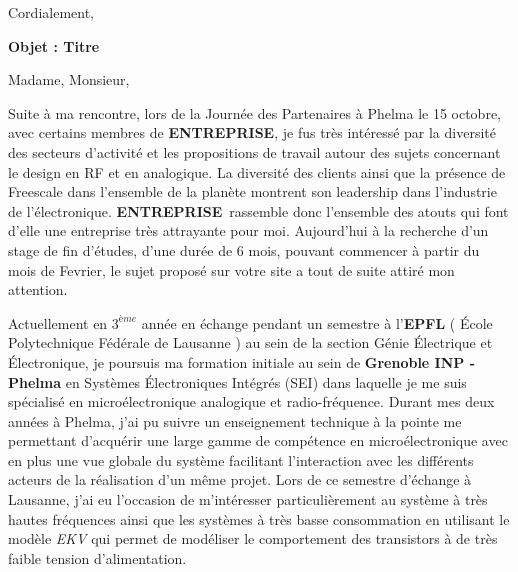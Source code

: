 \documentclass[11pt,a4paper]{moderncv}
\newcommand{\entreprise}{\textbf{ENTREPRISE}}
\begin{document}

\recipient{\entreprise}{Rue et numero\\CP Ville,\\Pays} %
\date{\today} %
\opening{} %
\closing{Cordialement,} %

\makelettertitle %
\justify %
\textbf{Objet : Titre}
\newline{}

Madame, Monsieur,\newline{}

\hspace{0.8cm} Suite à ma rencontre, lors de la Journée des Partenaires à Phelma le 15 octobre, avec certains membres de  \entreprise, je fus très intéressé par la diversité des secteurs d'activité et les propositions de travail autour des sujets concernant le design en RF et en analogique. La diversité des clients ainsi que la présence de Freescale dans l'ensemble de la planète montrent son leadership dans l'industrie de l'électronique. \entreprise~rassemble donc l'ensemble des atouts qui font d'elle une entreprise très attrayante pour moi. Aujourd'hui à la recherche d'un stage de fin d'études, d'une durée de 6 mois, pouvant commencer à partir du mois de Fevrier, le sujet proposé sur votre site a tout de suite attiré mon attention.\newline{}

\hspace{0.8cm} Actuellement en $3^{ème}$ année en échange pendant un semestre à l'\textbf{EPFL} ( École Polytechnique Fédérale de Lausanne ) au sein de la section Génie Électrique et Électronique, je poursuis ma formation initiale au sein de \textbf{Grenoble INP - Phelma} en Systèmes Électroniques Intégrés (SEI) dans laquelle je me suis spécialisé en microélectronique analogique et radio-fréquence. Durant mes deux années à Phelma, j'ai pu suivre un enseignement technique à la pointe me permettant d'acquérir une large gamme de compétence en microélectronique avec en plus une vue globale du système facilitant l'interaction avec les différents acteurs de la réalisation d'un même projet. 
Lors de ce semestre d'échange à Lausanne, j'ai eu l'occasion de m'intéresser particulièrement au système à très hautes fréquences ainsi que les systèmes à très basse consommation en utilisant le modèle \textit{EKV} qui permet de modéliser le comportement des transistors à de très faible tension d'alimentation.
\end{document}
